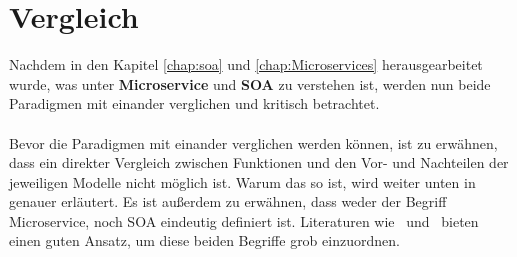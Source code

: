 \chapter{Vergleich}
\label{chap:vergleich}
Nachdem in den Kapitel \ref{chap:soa} und \ref{chap:Microservices} herausgearbeitet wurde, was unter \textbf{Microservice} und \textbf{SOA} zu verstehen ist, werden nun beide Paradigmen mit einander verglichen und kritisch betrachtet.
\\\\
Bevor die Paradigmen mit einander verglichen werden können, ist zu erwähnen, dass ein direkter Vergleich zwischen Funktionen und den Vor- und Nachteilen der jeweiligen Modelle nicht möglich ist. Warum das so ist, wird weiter unten in  genauer erläutert. Es ist außerdem zu erwähnen, dass weder der Begriff Microservice, noch SOA eindeutig definiert ist. Literaturen wie \cite{100QA}\ und \cite{EWolff2016:Microservices}\ bieten einen guten Ansatz, um diese beiden Begriffe grob einzuordnen.

